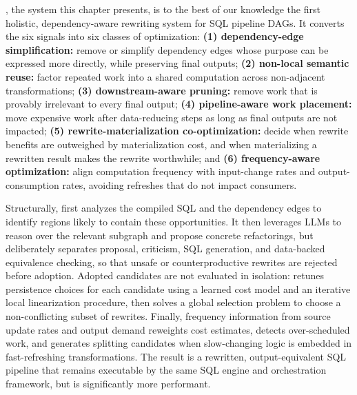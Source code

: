 \dagsmith, the system this chapter presents, is to the best of our
knowledge the first holistic, dependency-aware rewriting system for
SQL pipeline DAGs. It converts the six signals into six classes of
optimization: \textbf{(1) dependency-edge simplification:} remove or
simplify dependency edges whose purpose can be expressed more
directly, while preserving final outputs; \textbf{(2) non-local
semantic reuse:} factor repeated work into a shared computation across
non-adjacent transformations; \textbf{(3) downstream-aware pruning:}
remove work that is provably irrelevant to every final output;
\textbf{(4) pipeline-aware work placement:} move expensive work after
data-reducing steps as long as final outputs are not impacted;
\textbf{(5) rewrite-materialization co-optimization:} decide when
rewrite benefits are outweighed by materialization cost, and when
materializing a rewritten result makes the rewrite worthwhile; and
\textbf{(6) frequency-aware optimization:} align computation frequency
with input-change rates and output-consumption rates, avoiding
refreshes that do not impact consumers.

Structurally, \dagsmith first analyzes the compiled SQL and the
dependency edges to identify regions likely to contain these
opportunities. It then leverages LLMs to reason over the relevant
subgraph and propose concrete refactorings, but deliberately separates
proposal, criticism, SQL generation, and data-backed equivalence
checking, so that unsafe or counterproductive rewrites are rejected
before adoption. Adopted candidates are not evaluated in isolation:
\dagsmith retunes persistence choices for each candidate using a
learned cost model and an iterative local linearization procedure,
then solves a global selection problem to choose a non-conflicting
subset of rewrites. Finally, frequency information from source update
rates and output demand reweights cost estimates, detects
over-scheduled work, and generates splitting candidates when
slow-changing logic is embedded in fast-refreshing transformations.
The result is a rewritten, output-equivalent SQL pipeline that remains
executable by the same SQL engine and orchestration framework, but is
significantly more performant.

